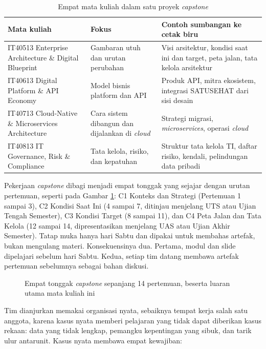 \begin{table}[!htb]
  \centering
  \caption{Empat mata kuliah dalam satu proyek \textit{capstone}}
  \label{tab:ch01-empat-mk}
  \footnotesize
  \begin{tabularx}{\textwidth}{>{\raggedright\arraybackslash}p{3.3cm}
      >{\raggedright\arraybackslash}X >{\raggedright\arraybackslash}X}
    \hline
    \textbf{Mata kuliah} & \textbf{Fokus} & \textbf{Contoh sumbangan ke cetak biru} \\
    \hline
    IT40513 Enterprise Architecture \& Digital Blueprint & Gambaran utuh dan urutan perubahan & Visi arsitektur, kondisi saat ini dan target, peta jalan, tata kelola arsitektur \\
    \hline
    IT40613 Digital Platform \& API Economy & Model bisnis platform dan API & Produk API, mitra ekosistem, integrasi SATUSEHAT dari sisi desain \\
    \hline
    IT40713 Cloud-Native \& Microservices Architecture & Cara sistem dibangun dan dijalankan di \textit{cloud} & Strategi migrasi, \textit{microservices}, operasi \textit{cloud} \\
    \hline
    IT40813 IT Governance, Risk \& Compliance & Tata kelola, risiko, dan kepatuhan & Struktur tata kelola TI, daftar risiko, kendali, pelindungan data pribadi \\
    \hline
  \end{tabularx}
\end{table}

Pekerjaan \textit{capstone} dibagi menjadi empat tonggak yang sejajar dengan
urutan pertemuan, seperti pada Gambar \ref{fig:ch01-tonggak}: C1 Konteks dan
Strategi (Pertemuan 1 sampai 3), C2 Kondisi Saat Ini (4 sampai 7, ditinjau
menjelang UTS atau Ujian Tengah Semester), C3 Kondisi Target (8 sampai 11),
dan C4 Peta Jalan dan Tata Kelola (12 sampai 14, dipresentasikan menjelang UAS
atau Ujian Akhir Semester). Tatap muka hanya hari Sabtu dan dipakai untuk
membahas artefak, bukan mengulang materi. Konsekuensinya dua. Pertama, modul
dan slide dipelajari sebelum hari Sabtu. Kedua, setiap tim datang membawa
artefak pertemuan sebelumnya sebagai bahan diskusi.

\begin{figure}[!htb]
  \centering
  
  \caption{Empat tonggak \textit{capstone} sepanjang 14 pertemuan, beserta luaran
           utama mata kuliah ini}
  \label{fig:ch01-tonggak}
\end{figure}

Tim dianjurkan memakai organisasi nyata, sebaiknya tempat kerja salah satu
anggota, karena kasus nyata memberi pelajaran yang tidak dapat diberikan kasus
rekaan: data yang tidak lengkap, pemangku kepentingan yang sibuk, dan tarik
ulur antarunit. Kasus nyata membawa empat kewajiban:

